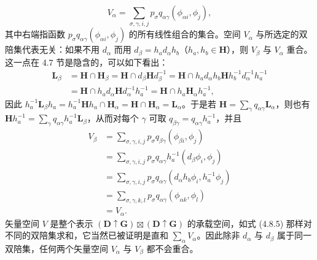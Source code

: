 \begin{equation*}
V_{\alpha} = \sum_{\sigma, \gamma, i, j}p_{\sigma}q_{\alpha\gamma}(\phi_{\alpha i}, \phi_{j}),
\tag{4.8.7}
\end{equation*}
其中右端指函数 $p_{\sigma}q_{\alpha\gamma}(\phi_{\alpha i}, \phi_{j})$ 的所有线性组合的集合。空间 $V_{\alpha}$ 与所选定的双陪集代表无关：如果不用 $d_{\alpha}$ 而用 $d_{\beta} = h_{a}d_{\alpha}h_{b}$（$h_{a}, h_{b} \in \mathbf{H}$），则 $V_{\beta}$ 与 $V_{\alpha}$ 重合。这一点在 4.7 节是隐含的，可以如下看出：
\begin{equation*}
\begin{array}{rl}
\mathbf{L}_{\beta} &= \mathbf{H} \cap \mathbf{H}_{\beta} = \mathbf{H} \cap d_{\beta}\mathbf{H}d^{-1}_{\beta} = \mathbf{H} \cap h_{a}d_{\alpha}h_{b}\mathbf{H}h^{-1}_{b}d^{-1}_{\alpha}h^{-1}_{a}\\
&= \mathbf{H} \cap h_{a}d_{\alpha}\mathbf{H}d^{-1}_{\alpha}h^{-1}_{a} = \mathbf{H} \cap h_{a}\mathbf{H}_{\alpha}h^{-1}_{a},
\end{array}
\end{equation*}
因此 $h^{-1}_{a}\mathbf{L}_{\beta}h_{a} = h^{-1}_{a}\mathbf{H}h_{a} \cap \mathbf{H}_{\alpha} = \mathbf{H} \cap \mathbf{H}_{\alpha} = \mathbf{L}_{\alpha}$。于是若 $\mathbf{H} = \sum_{\gamma}q_{\alpha\gamma}\mathbf{L}_{\alpha}$，则也有 $\mathbf{H}h^{-1}_{a} = \sum_{\gamma}q_{\alpha\gamma}h^{-1}_{a}\mathbf{L}_{\beta}$，从而对每个 $\gamma$ 可取 $q_{\beta\gamma} = q_{\alpha\gamma}h^{-1}_{a}$，并且
\begin{equation*}
\begin{array}{rl}
V_{\beta} &= \sum_{\sigma, \gamma, i, j}p_{\sigma}q_{\beta\gamma}(\phi_{\beta i}, \phi_{j})\\
&= \sum_{\sigma, \gamma, i, j}p_{\sigma}q_{\alpha\gamma}h^{-1}_{a}(d_{\beta}\phi_{i}, \phi_{j})\\
&= \sum_{\sigma, \gamma, i, j}p_{\sigma}q_{\alpha\gamma}(d_{\alpha}h_{b}\phi_{i}, h^{-1}_{a}\phi_{j})\\
&= \sum_{\sigma, \gamma, k, l}p_{\sigma}q_{\alpha\gamma}(\phi_{\alpha k}, \phi_{l})\\
&= V_{\alpha}.
\end{array}
\tag{4.8.8}
\end{equation*}
矢量空间 $V$ 是整个表示 $(\mathbf{D} \uparrow \mathbf{G}) \boxtimes (\mathbf{D} \uparrow \mathbf{G})$ 的承载空间，如式 (4.8.5) 那样对不同的双陪集求和，它当然已被证明是直和 $\sum_{\alpha}V_{\alpha}$。因此除非 $d_{\alpha}$ 与 $d_{\beta}$ 属于同一双陪集，任何两个矢量空间 $V_{\alpha}$ 与 $V_{\beta}$ 都不会重合。


